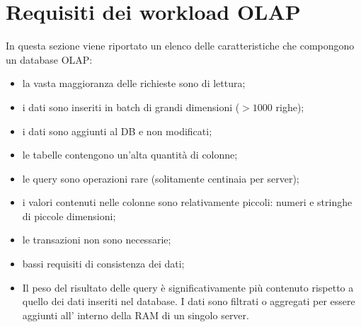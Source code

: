 \section{Requisiti dei workload OLAP}
In questa sezione viene riportato un elenco delle caratteristiche che compongono un database OLAP:
\begin{itemize}
	\item la vasta maggioranza delle richieste sono di lettura;
	\item i dati sono inseriti in batch di grandi dimensioni ($>1000$ righe);
	\item i dati sono aggiunti al DB e non modificati;
	\item le tabelle contengono un’alta quantità di colonne; 
	\item le query sono operazioni rare (solitamente centinaia per server);
	\item i valori contenuti nelle colonne sono relativamente piccoli: numeri e stringhe di piccole dimensioni;
	\item le transazioni non sono necessarie;
	\item bassi requisiti di consistenza dei dati;
	\item Il peso del risultato delle query è significativamente più contenuto rispetto a quello dei dati inseriti nel database. I dati sono filtrati o aggregati per essere aggiunti all’ interno della RAM di un singolo server.
\end{itemize}















